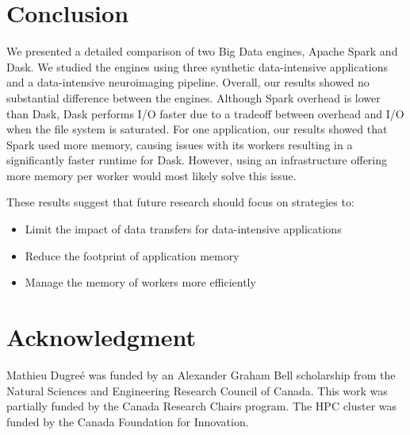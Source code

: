 \documentclass[AMA,STIX1COL]{WileyNJD-v2}
\begin{document}
\section{Conclusion}
We presented a detailed comparison of two Big Data engines, Apache Spark and Dask.
We studied the engines using three synthetic data-intensive applications and a data-intensive neuroimaging pipeline.
Overall, our results showed no substantial difference between the engines.
Although Spark overhead is lower than Dask, Dask performs I/O faster due to a tradeoff between overhead and I/O when the file system is saturated.
For one application, our results showed that Spark used more memory, causing issues with its workers resulting in a significantly faster runtime for Dask.
However, using an infrastructure offering more memory per worker would most likely solve this issue.
		
These results suggest that future research should focus on strategies to:
\begin{itemize}
	\item Limit the impact of data transfers for data-intensive applications
	\item Reduce the footprint of application memory
	\item Manage the memory of workers more efficiently
\end{itemize}
		
\section*{Acknowledgment}
Mathieu Dugre\'e was funded by an Alexander Graham Bell scholarship from
the Natural Sciences and Engineering Research Council of Canada. This work
was partially funded by the Canada Research Chairs program. The HPC cluster
was funded by the Canada Foundation for Innovation.
		


\end{document}

